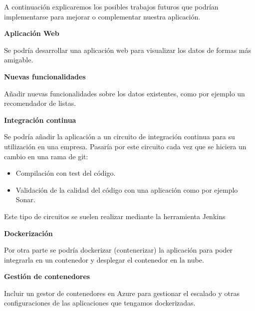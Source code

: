 \documentclass[12pt]{report} %
\begin{document}
A continuación explicaremos los posibles trabajos futuros que podrían implementarse para mejorar o complementar nuestra aplicación.

\textbf{Aplicación Web}

Se podría desarrollar una aplicación web para visualizar los datos de formas más amigable.

\textbf{Nuevas funcionalidades}

Añadir nuevas funcionalidades sobre los datos existentes, como por ejemplo un recomendador de listas.

\textbf{Integración continua}

Se podría añadir la aplicación a un circuito de integración continua para su utilización en una empresa.
Pasaría por este circuito cada vez que se hiciera un cambio en una rama de git:
\begin{itemize}
	\item Compilación con test del código.
	\item Validación de la calidad del código con una aplicación como por ejemplo Sonar.
\end{itemize}

Este tipo de circuitos se suelen realizar mediante la herramienta Jenkins

\textbf{Dockerización}

Por otra parte se podría dockerizar (contenerizar) la aplicación para poder integrarla en un contenedor y desplegar el contenedor en la nube.

\textbf{Gestión de contenedores}

Incluir un gestor de contenedores en Azure para gestionar el escalado y otras configuraciones de las aplicaciones que tengamos dockerizadas.







\clearpage
{}
\printbibliography




\end{document}
